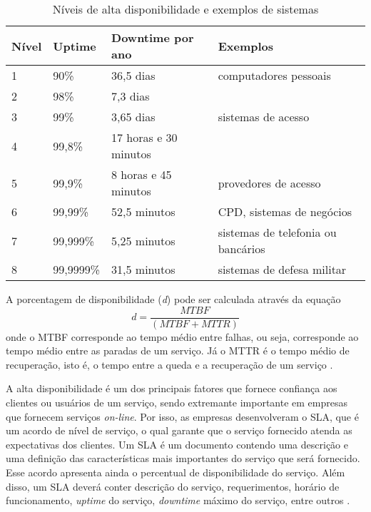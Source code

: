 \begin{table}[h!]
\caption {Níveis de alta disponibilidade e exemplos de sistemas}
\label{tab:dispniveis}
\begin{center}
\begin{tabular}{|l|l|l|l|}\hline
\textbf{Nível} & \textbf{Uptime} & \textbf{Downtime por ano} & \textbf{Exemplos} \\\hline
1 & 90\% & 36,5 dias & computadores pessoais\\\hline
2 & 98\% & 7,3 dias & \\\hline
3 & 99\% & 3,65 dias & sistemas de acesso\\\hline
4 & 99,8\% & 17 horas e 30 minutos & \\\hline
5 & 99,9\% & 8 horas e 45 minutos & provedores de acesso\\\hline
6 & 99,99\% & 52,5 minutos & CPD, sistemas de negócios\\\hline
7 & 99,999\% & 5,25 minutos & sistemas de telefonia ou bancários\\\hline
8 & 99,9999\% & 31,5 minutos & sistemas de defesa militar\\\hline
\end{tabular}
\end{center}
\end{table}

A porcentagem de disponibilidade (\textit{d}) pode ser calculada através da equação
\begin{equation}
d = \frac{MTBF}{(MTBF + MTTR)}
\label{disponibilidade}
\end{equation}
onde o \ac{MTBF} corresponde ao tempo médio entre falhas, ou seja, corresponde ao tempo médio entre as paradas de um serviço. Já o \ac{MTTR} é o 
tempo médio de recuperação, isto é, o tempo entre a queda e a recuperação de um serviço \cite{goncalves2009}.

A alta disponibilidade é um dos principais fatores que fornece confiança aos clientes ou usuários de um serviço, sendo extremante importante 
em empresas que fornecem serviços \textit{on-line}. Por isso, as empresas desenvolveram o \ac{SLA}, que é um acordo de nível de serviço, 
o qual garante que o serviço fornecido atenda as expectativas dos clientes. Um \ac{SLA} é um documento contendo uma descrição e uma definição 
das características mais importantes do serviço que será fornecido. Esse acordo apresenta ainda o percentual de disponibilidade do serviço.
Além disso, um \ac{SLA} deverá conter descrição do serviço, requerimentos, horário de funcionamento, \textit{uptime} do serviço, 
\textit{downtime} máximo do serviço, entre outros \cite{smith2010}.

